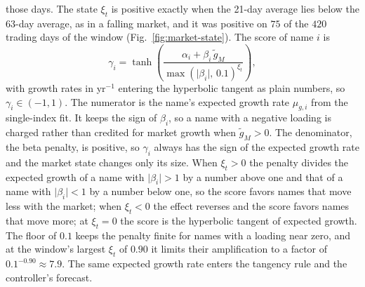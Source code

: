 those days. The state $\xi_t$ is positive exactly when the 21-day average lies below the 63-day average, as in a
falling market, and it was positive on $75$ of the $420$ trading days of the window (Fig.~\ref{fig:market-state}).
The score of name $i$ is
\begin{equation}
\gamma_i = \tanh\!\left( \frac{\alpha_i + \beta_i\, \tilde g_M}{\max(\lvert\beta_i\rvert,\, 0.1)^{\xi_t}} \right),
\label{eq:gamma}
\end{equation}
with growth rates in yr$^{-1}$ entering the hyperbolic tangent as plain numbers, so $\gamma_i \in (-1, 1)$. The
numerator is the name's expected growth rate $\mu_{g,i}$ from the single-index fit. It keeps the sign of $\beta_i$,
so a name with a negative loading is charged rather than credited for market growth when $\tilde g_M > 0$. The
denominator, the beta penalty, is positive, so $\gamma_i$ always has the sign of the expected growth rate and the
market state changes only its size. When $\xi_t > 0$ the penalty divides the expected growth of a name with
$\lvert\beta_i\rvert > 1$ by a number above one and that of a name with $\lvert\beta_i\rvert < 1$ by a number below
one, so the score favors names that move less with the market; when $\xi_t < 0$ the effect reverses and the score
favors names that move more; at $\xi_t = 0$ the score is the hyperbolic tangent of expected growth. The floor of
$0.1$ keeps the penalty finite for names with a loading near zero, and at the window's largest $\xi_t$ of $0.90$ it
limits their amplification to a factor of $0.1^{-0.90} \approx 7.9$. The same expected growth rate enters the
tangency rule and the controller's forecast.

